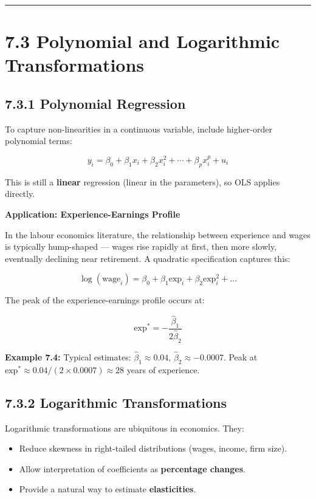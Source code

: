 \medskip\hrule\medskip

\section{7.3 Polynomial and Logarithmic Transformations}

\subsection{7.3.1 Polynomial Regression}

To capture non-linearities in a continuous variable, include higher-order polynomial terms:

\[
y_i = \beta_0 + \beta_1 x_i + \beta_2 x_i^2 + \cdots + \beta_p x_i^p + u_i
\]

This is still a \textbf{linear} regression (linear in the parameters), so OLS applies directly.

\textbf{Application: Experience-Earnings Profile}

In the labour economics literature, the relationship between experience and wages is typically hump-shaped --- wages rise rapidly at first, then more slowly, eventually declining near retirement. A quadratic specification captures this:

\[
\log(\text{wage}_i) = \beta_0 + \beta_1 \text{exp}_i + \beta_2 \text{exp}_i^2 + \ldots
\]

The peak of the experience-earnings profile occurs at:

\[
\text{exp}^* = -\frac{\hat{\beta}_1}{2\hat{\beta}_2}
\]

\textbf{Example 7.4:} Typical estimates: $\hat{\beta}_1 \approx 0.04$, $\hat{\beta}_2 \approx -0.0007$. Peak at $\text{exp}^* \approx 0.04/(2 \times 0.0007) \approx 28$ years of experience.

\subsection{7.3.2 Logarithmic Transformations}

Logarithmic transformations are ubiquitous in economics. They:
\begin{itemize}
\item Reduce skewness in right-tailed distributions (wages, income, firm size).
\item Allow interpretation of coefficients as \textbf{percentage changes}.
\item Provide a natural way to estimate \textbf{elasticities}.
\end{itemize}

